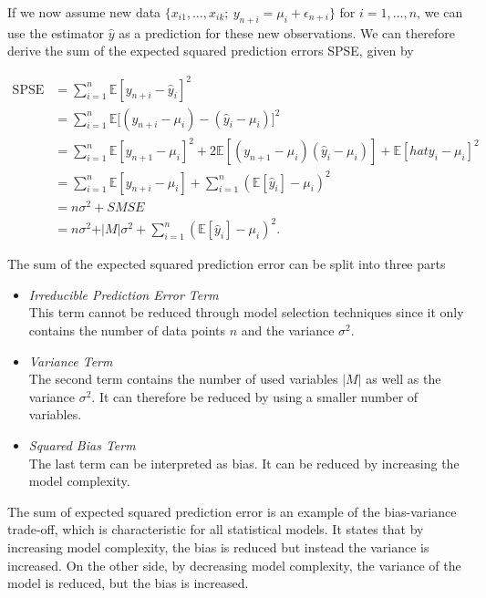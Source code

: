 \documentclass[10pt,a4paper]{article}
\begin{document}
If we now assume new data $\{ x_{i1}, \dots, x_{ik}; \ y_{n+i} = \mu_i + \epsilon_{n+i}\}$ for $i = 1, \dots, n$, we can use the estimator $\hat  y$ as a prediction for these new observations. We can therefore derive the sum of the expected squared prediction errors SPSE, given by

\begin{equation}
\begin{split}
	\text{SPSE} &= \sum_{i=1}^n \mathbb{E}[y_{n+i} - \hat y_i]^2 \\ 
				&= \sum_{i=1}^n \mathbb{E}\big[(y_{n+i} - \mu_i) - (\hat y_i - \mu_i)\big]^2 \\ 
				&= \sum_{i=1}^n \mathbb{E}[y_{n+1} - \mu_i]^2 + 2\mathbb{E}[(y_{n+1} - \mu_i)(\hat y_i - \mu_i)] + \mathbb{E}[hat y_i - \mu_i]^2 \\
				&= \sum_{i=1}^n\mathbb{E}[y_{n+i} - \mu_i] + \sum_{i=1}^n(\mathbb{E}[\hat y_i] - \mu_i)^2 \\ 
				&= n\sigma^2 + SMSE \\ 
				&= n\sigma^2 + \vert M \vert \sigma^2 + \sum_{i=1}^n(\mathbb{E}[\hat y_i] - \mu_i)^2.
\end{split}
\end{equation}


The sum of the expected squared prediction error can be split into three parts

\begin{itemize}
	\item \emph{Irreducible Prediction Error Term} \\
	This term cannot be reduced through model selection techniques since it only contains the number of data points $n$ and the variance $\sigma^2$.

	\item \emph{Variance Term} \\
	The second term contains the number of used variables $\vert M \vert$ as well as the variance $\sigma^2$. It can therefore be reduced by using a smaller number of variables.
	
	\item \emph{Squared Bias Term} \\
	The last term can be interpreted as bias. It can be reduced by increasing the model complexity.
\end{itemize}

The sum of expected squared prediction error is an example of the bias-variance trade-off, which is characteristic for all statistical models. It states that by increasing model complexity, the bias is reduced but instead the variance is increased. On the other side, by decreasing model complexity, the variance of the model is reduced, but the bias is increased. \cite{bishop2006patternRecognition}
\end{document}
